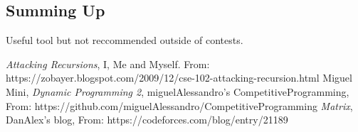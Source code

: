 \documentclass{IEEEtran}
\begin{document}
        \subsection{Summing Up}
            Useful tool but not reccommended outside of contests.

\begin{thebibliography}{}
        \textit{Attacking Recursions},
        I, Me and Myself.
        From: https://zobayer.blogspot.com/2009/12/cse-102-attacking-recursion.html
        Miguel Mini,
        \textit{Dynamic Programming 2},
        miguelAlessandro's CompetitiveProgramming,
        From: https://github.com/miguelAlessandro/CompetitiveProgramming
        \textit{Matrix},
        DanAlex's blog,
        From: https://codeforces.com/blog/entry/21189


\end{thebibliography}
\end{document}
